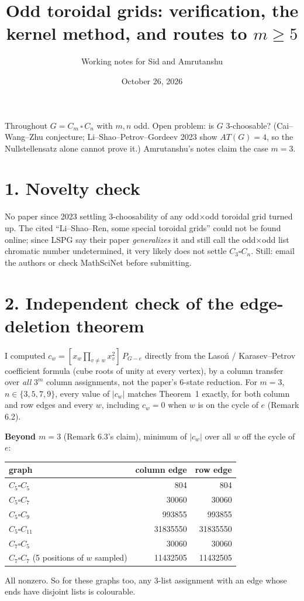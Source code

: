 \documentclass[11pt]{article}
\title{Odd toroidal grids: verification, the kernel method, and routes to $m\ge 5$}
\author{Working notes for Sid and Amrutanshu}
\date{October 26, 2026}
\theoremstyle{remark}\newtheorem*{remark}{Remark}
\begin{document}
\maketitle
\vspace{-2em}

Throughout $G=C_m\,\square\,C_n$ with $m,n$ odd. Open problem: is $G$ 3-choosable?
(Cai--Wang--Zhu conjecture; Li--Shao--Petrov--Gordeev 2023 show $AT(G)=4$, so the
Nullstellensatz alone cannot prove it.) Amrutanshu's notes claim the case $m=3$.

\section*{1. Novelty check}
No paper since 2023 settling 3-choosability of any odd$\times$odd toroidal grid turned
up. The cited ``Li--Shao--Ren, some special toroidal grids'' could not be found online;
since LSPG say their paper \emph{generalizes} it and still call the odd$\times$odd list
chromatic number undetermined, it very likely does not settle $C_3\square C_n$. Still:
email the authors or check MathSciNet before submitting.

\section*{2. Independent check of the edge-deletion theorem}
I computed $c_w=[x_w\prod_{v\ne w}x_v^2]\,P_{G-e}$ directly from the Laso\'n /
Karasev--Petrov coefficient formula (cube roots of unity at every vertex), by a
column transfer over \emph{all} $3^m$ column assignments, not the paper's 6-state
reduction. For $m=3$, $n\in\{3,5,7,9\}$, every value of $|c_w|$ matches Theorem~1
exactly, for both column and row edges and every $w$, including $c_w=0$ when $w$
is on the cycle of $e$ (Remark 6.2).

\textbf{Beyond $m=3$} (Remark 6.3's claim), minimum of $|c_w|$ over all $w$ off
the cycle of $e$:

\begin{center}
\begin{tabular}{@{}lrr@{}}
\toprule
graph & column edge & row edge\\
\midrule
$C_5\square C_5$ & 804 & 804\\
$C_5\square C_7$ & 30060 & 30060\\
$C_5\square C_9$ & 993855 & 993855\\
$C_5\square C_{11}$ & 31835550 & 31835550\\
$C_7\square C_5$ & 30060 & 30060\\
$C_7\square C_7$ (5 positions of $w$ sampled) & 11432505 & 11432505\\
\bottomrule
\end{tabular}
\end{center}
All nonzero. So for these graphs too, any 3-list assignment with an edge whose ends
have disjoint lists is colourable.
\end{document}
